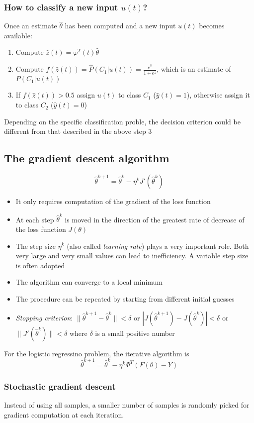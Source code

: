 \documentclass{book}
\begin{document}
\subsubsection{How to classify a new input $u(t)$?}
Once an estimate $\hat{\theta}$ has been computed and a new input $u(t)$ becomes available:
\begin{enumerate}
    \item Compute $\hat{z}(t)=\varphi^T(t)\hat{\theta}$ 
    \item Compute $f(\hat{z}(t))=\hat{P}(C_1|u(t)) = \frac{e^{\hat{z}}}{1+e^{\hat{z}}}$, which is an estimate of $P(C_1|u(t))$ 
    \item If $f(\hat{z}(t))>0.5$ assign $u(t)$ to class $C_1$ ($\hat{y}(t)=1$), otherwise assign it to class $C_2$ ($\hat{y}(t)=0$)
\end{enumerate}
Depending on the specific classification proble, the decision criterion could be different from that described in the above step 3
\subsection{The gradient descent algorithm}
\[
    \hat{\theta}^{k+1} = \hat{\theta}^k-\eta^kJ'(\hat{\theta}^k)
\]
\begin{itemize}
    \item It only requires computation of the gradient of the loss function 
    \item At each step $\hat{\theta}^k$ is moved in the direction of the greatest rate of decrease of the loss function $J(\theta)$ 
    \item The step size $\eta^k$ (also called \emph{learning rate}) plays a very important role. Both very large and very small values can lead to inefficiency. A variable step size is often adopted 
    \item The algorithm can converge to a local minimum 
    \item The procedure can be repeated by starting from different initial guesses  
    \item \emph{Stopping criterion}: $\|\hat{\theta}^{k+1}-\hat{\theta}^k\|<\delta$ or $|J(\hat{\theta}^{k+1})-J(\hat{\theta}^k)|<\delta$ or $\|J'(\hat{\theta}^k)\|<\delta$ where $\delta$ is a small positive number 
\end{itemize}
For the logistic regressino problem, the iterative algorithm is 
\[
    \hat{\theta}^{k+1} = \hat{\theta}^k-\eta^k \Phi^T(F(\theta)-Y)
\]
\subsubsection{Stochastic gradient descent}
Instead of using all samples, a smaller number of samples is randomly picked for gradient computation at each iteration. 
\end{document}
